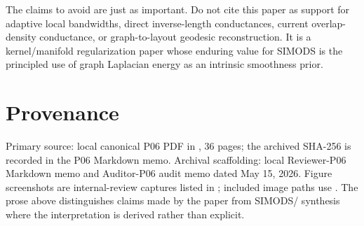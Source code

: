 \documentclass[11pt]{article}
\begin{document}
The claims to avoid are just as important.  Do not cite this paper as support
for adaptive local bandwidths, direct inverse-length conductances, current
 overlap-density conductance, or graph-to-layout geodesic
reconstruction.  It is a kernel/manifold regularization paper whose enduring
value for SIMODS is the principled use of graph Laplacian energy as an
intrinsic smoothness prior.

\section*{Provenance}

Primary source: local canonical P06 PDF in , 36 pages; the
archived SHA-256 is recorded in the P06 Markdown memo.
Archival scaffolding: local Reviewer-P06 Markdown memo and Auditor-P06 audit
memo dated May 15, 2026.  Figure screenshots are internal-review captures
listed in ; included image paths use
.  The prose above distinguishes claims made by
the paper from SIMODS/ synthesis where the interpretation is
derived rather than explicit.



\end{document}
